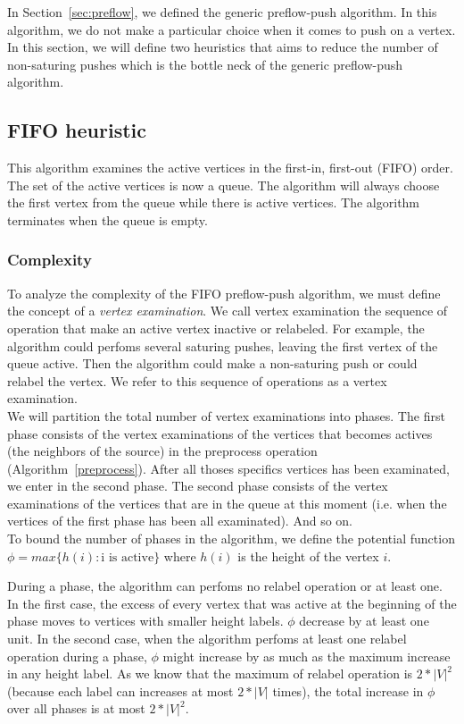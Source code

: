 In Section~\ref{sec:preflow}, we defined the generic preflow-push algorithm. In this algorithm, we do not make a particular choice when it comes to push on a vertex. In this section, we will define two heuristics that aims to reduce the number of non-saturing pushes which is the bottle neck of the generic preflow-push algorithm.

\subsection{FIFO heuristic}

This algorithm examines the active vertices in the first-in, first-out (FIFO) order. The set of the active vertices is now a queue. The algorithm will always choose the first vertex from the queue while there is active vertices. The algorithm terminates when the queue is empty. 

\subsubsection{Complexity}

To analyze the complexity of the FIFO preflow-push algorithm, we must define the concept of a \textit{vertex examination}. We call vertex examination the sequence of operation that make an active vertex inactive or relabeled. For example, the algorithm could perfoms several saturing pushes, leaving the first vertex of the queue active. Then the algorithm could make a non-saturing push or could relabel the vertex. We refer to this sequence of operations as a vertex examination.\\

We will partition the total number of vertex examinations into phases. The first phase consists of the vertex examinations of the vertices that becomes actives (the neighbors of the source) in the preprocess operation (Algorithm~\ref{preprocess}). After all thoses specifics vertices has been examinated, we enter in the second phase. The second phase consists of the vertex examinations of the vertices that are in the queue at this moment (i.e. when the vertices of the first phase has been all examinated). And so on.\\

To bound the number of phases in the algorithm, we define the potential function $\phi = max\{h(i) : \text{i is active}\}$ where $h(i)$ is the height of the vertex $i$.

During a phase, the algorithm can perfoms no relabel operation or at least one. In the first case, the excess of every vertex that was active at the beginning of the phase moves to vertices with smaller height labels. $\phi$ decrease by at least one unit. In the second case, when the algorithm perfoms at least one relabel operation during a phase, $\phi$ might increase by as much as the maximum increase in any height label. As we know that the maximum of relabel operation is $2*|V|^2$ (because each label can increases at most $2*|V|$ times), the total increase in $\phi$ over all phases is at most $2*|V|^2$.

